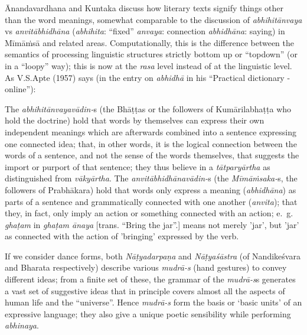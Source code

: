 Ānandavardhana and Kuntaka discuss how literary texts signify things other than the word meanings, somewhat comparable to the discussion of \textsl{abhihitānvaya} vs \textsl{anvitābhidhāna} (\textsl{abhihita}: “fixed” \textsl{anvaya}: connection \textsl{abhidhāna}: saying) in Mīmāṁsā and related areas. Computationally, this is the difference between the semantics of processing linguistic structures strictly bottom up or “topdown” (or in a “loopy” way); this is now at the \textsl{rasa} level instead of at the linguistic level. As V.S.Apte (1957) says (in the entry on \textsl{abhidhā} in his “Practical dictionary - online”):
\begin{myquote}
The \textsl{abhihitānvayavādin-}s (the Bhāṭṭas or the followers of Kumārilabhaṭṭa who hold the doctrine) hold that words by themselves can express their own independent meanings which are afterwards combined into a sentence expressing one connected idea; that, in other words, it is the logical connection between the words of a sentence, and not the sense of the words themselves, that suggests the import or purport of that sentence; they thus believe in a \textsl{tātparyārtha} as distinguished from \textsl{vākyārtha}. The \textsl{anvitābhidhānavādin-}s (the \textsl{Mīmāṁsaka-}s, the followers of Prabhākara) hold that words only express a meaning (\textsl{abhidhāna}) as parts of a sentence and grammatically connected with one another (\textsl{anvita}); that they, in fact, only imply an action or something connected with an action; e.~g. \textsl{ghaṭam} in \textsl{ghaṭam ānaya} [trans. “Bring the jar”.] means not merely 'jar', but 'jar' as connected with the action of 'bringing' expressed by the verb.
\end{myquote}

If we consider dance forms, both \textsl{Nāṭyadarpaṇa} and \textsl{Nāṭyaśāstra} (of Nandikeśvara and Bharata respectively) describe various \textsl{mudrā-s} (hand gestures) to convey different ideas; from a finite set of these, the grammar of the \textsl{mudrā-s}s generates a vast set of suggestive ideas that in principle covers almost all the aspects of human life and the “universe”. Hence \textsl{mudrā-s} form the basis or ‘basic units’ of an expressive language; they also give a unique poetic sensibility while performing \textsl{abhinaya}.

